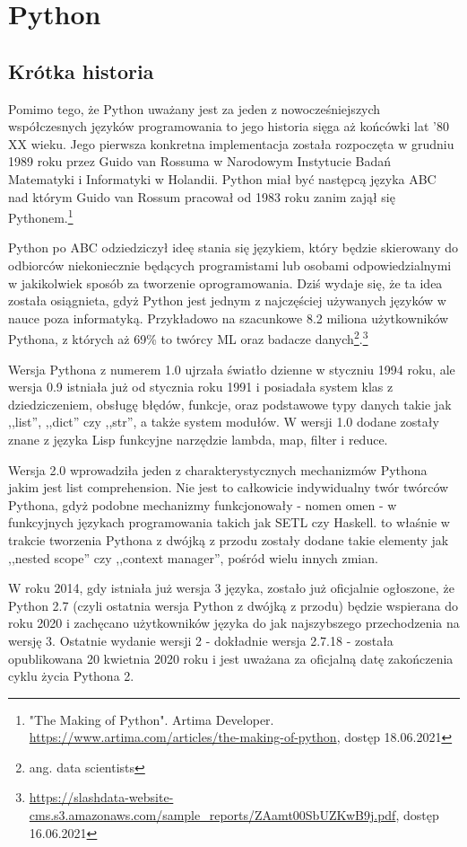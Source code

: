 \chapter{Python}

\section{Krótka historia}
Pomimo tego, że Python uważany jest za jeden z nowocześniejszych współczesnych języków programowania to jego historia sięga aż końcówki lat '80 XX wieku. Jego pierwsza konkretna implementacja została rozpoczęta w grudniu 1989 roku przez Guido van Rossuma w Narodowym Instytucie Badań Matematyki i Informatyki w Holandii. Python miał być następcą języka ABC nad którym Guido van Rossum pracował od 1983 roku zanim zajął się Pythonem.\footnote{ "The Making of Python". Artima Developer. \url{https://www.artima.com/articles/the-making-of-python}, dostęp 18.06.2021}

Python po ABC odziedziczył ideę stania się językiem, który będzie skierowany do odbiorców niekoniecznie będących programistami lub osobami odpowiedzialnymi w jakikolwiek sposób za tworzenie oprogramowania. Dziś wydaje się, że ta idea została osiągnieta, gdyż Python jest jednym z najczęściej używanych języków w nauce poza informatyką. Przykładowo na szacunkowe 8.2 miliona użytkowników Pythona, z których aż 69\% to twórcy ML oraz badacze danych\footnote{ang. data scientists}.\footnote{\url{https://slashdata-website-cms.s3.amazonaws.com/sample_reports/ZAamt00SbUZKwB9j.pdf}, dostęp 16.06.2021}

Wersja Pythona z numerem 1.0 ujrzała światło dzienne w styczniu 1994 roku, ale wersja 0.9 istniała już od stycznia roku 1991 i posiadała system klas z dziedziczeniem, obsługę błędów, funkcje, oraz podstawowe typy danych takie jak ,,list'', ,,dict'' czy ,,str'', a także system modułów. W wersji 1.0 dodane zostały znane z języka Lisp funkcyjne narzędzie lambda, map, filter i reduce.

Wersja 2.0 wprowadziła jeden z charakterystycznych mechanizmów Pythona jakim jest list comprehension. Nie jest to całkowicie indywidualny twór twórców Pythona, gdyż podobne mechanizmy funkcjonowały - nomen omen - w funkcyjnych językach programowania takich jak SETL czy Haskell. to właśnie w trakcie tworzenia Pythona z dwójką z przodu zostały dodane takie elementy jak ,,nested scope'' czy ,,context manager'', pośród wielu innych zmian.

W roku 2014, gdy istniała już wersja 3 języka, zostało już oficjalnie ogłoszone, że Python 2.7 (czyli ostatnia wersja Python z dwójką z przodu) będzie wspierana do roku 2020 i zachęcano użytkowników języka do jak najszybszego przechodzenia na wersję 3. Ostatnie wydanie wersji 2 - dokładnie wersja 2.7.18 - została opublikowana 20 kwietnia 2020 roku i jest uważana za oficjalną datę zakończenia cyklu życia Pythona 2.


